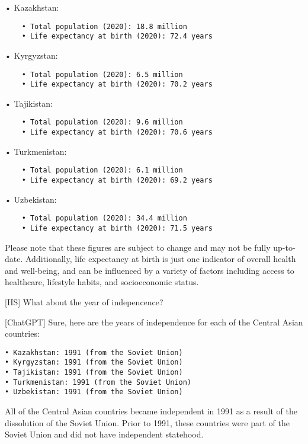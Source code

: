 \documentclass[
]{bxjsbook}
\theoremstyle{definition}
\theoremstyle{definition}
\theoremstyle{definition}
\theoremstyle{definition}
\theoremstyle{remark}
\begin{document}
• Kazakhstan:

\begin{verbatim}
    • Total population (2020): 18.8 million
    • Life expectancy at birth (2020): 72.4 years
\end{verbatim}

• Kyrgyzstan:

\begin{verbatim}
    • Total population (2020): 6.5 million
    • Life expectancy at birth (2020): 70.2 years
\end{verbatim}

• Tajikistan:

\begin{verbatim}
    • Total population (2020): 9.6 million
    • Life expectancy at birth (2020): 70.6 years
\end{verbatim}

• Turkmenistan:

\begin{verbatim}
    • Total population (2020): 6.1 million
    • Life expectancy at birth (2020): 69.2 years
\end{verbatim}

• Uzbekistan:

\begin{verbatim}
    • Total population (2020): 34.4 million
    • Life expectancy at birth (2020): 71.5 years
\end{verbatim}

Please note that these figures are subject to change and may not be fully up-to-date. Additionally, life expectancy at birth is just one indicator of overall health and well-being, and can be influenced by a variety of factors including access to healthcare, lifestyle habits, and socioeconomic status.

{[}HS{]} What about the year of indepencence?

{[}ChatGPT{]} Sure, here are the years of independence for each of the Central Asian countries:

\begin{verbatim}
• Kazakhstan: 1991 (from the Soviet Union)
• Kyrgyzstan: 1991 (from the Soviet Union)
• Tajikistan: 1991 (from the Soviet Union)
• Turkmenistan: 1991 (from the Soviet Union)
• Uzbekistan: 1991 (from the Soviet Union)
\end{verbatim}

All of the Central Asian countries became independent in 1991 as a result of the dissolution of the Soviet Union. Prior to 1991, these countries were part of the Soviet Union and did not have independent statehood.
\end{document}
